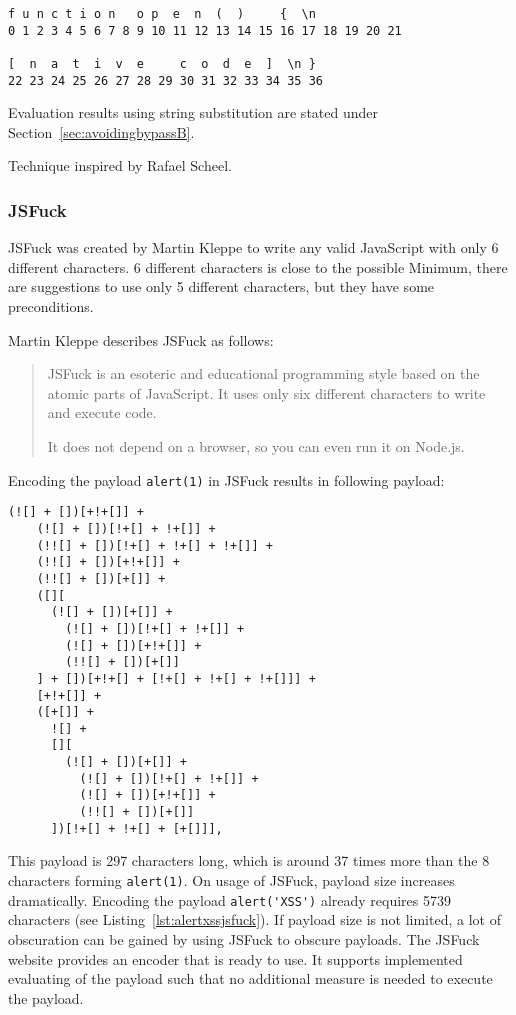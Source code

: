 \begin{lstlisting}[style=basicStyle, caption=open.toString() with indices in JavaScript, label={lst:opentostringindices}]
f u n c t i o n   o p  e  n  (  )     {  \n
0 1 2 3 4 5 6 7 8 9 10 11 12 13 14 15 16 17 18 19 20 21

[  n  a  t  i  v  e     c  o  d  e  ]  \n }
22 23 24 25 26 27 28 29 30 31 32 33 34 35 36
\end{lstlisting}

Evaluation results using string substitution are stated under Section~\ref{sec:avoidingbypassB}.

Technique inspired by Rafael Scheel. \cite{onecons/wafbypass}


\subsubsection{JSFuck}
\label{sec:jsfuck}
JSFuck was created by Martin Kleppe to write any valid JavaScript with only 6 different characters. 6 different characters is close to the possible Minimum, there are suggestions to use only 5 different characters, but they have some preconditions. \cite{mk/five, tc39/pipeline}

Martin Kleppe describes JSFuck as follows:
\begin{quote}
	JSFuck is an esoteric and educational programming style based on the atomic parts of JavaScript. It uses only six different characters to write and execute code.

	It does not depend on a browser, so you can even run it on Node.js. \cite{mk/jsfuck}
\end{quote}

Encoding the payload \verb|alert(1)| in JSFuck results in following payload:

\begin{lstlisting}[style=basicStyle, caption=alert(1) in JSFuck, label={lst:alert1jsfuck}]
  (![] + [])[+!+[]] +
    (![] + [])[!+[] + !+[]] +
    (!![] + [])[!+[] + !+[] + !+[]] +
    (!![] + [])[+!+[]] +
    (!![] + [])[+[]] +
    ([][
      (![] + [])[+[]] +
        (![] + [])[!+[] + !+[]] +
        (![] + [])[+!+[]] +
        (!![] + [])[+[]]
    ] + [])[+!+[] + [!+[] + !+[] + !+[]]] +
    [+!+[]] +
    ([+[]] +
      ![] +
      [][
        (![] + [])[+[]] +
          (![] + [])[!+[] + !+[]] +
          (![] + [])[+!+[]] +
          (!![] + [])[+[]]
      ])[!+[] + !+[] + [+[]]],
\end{lstlisting}

This payload is 297 characters long, which is around 37 times more than the 8 characters forming \verb|alert(1)|. On usage of JSFuck, payload size increases dramatically. Encoding the payload \verb|alert('XSS')| already requires 5739 characters (see Listing~\ref{lst:alertxssjsfuck}). If payload size is not limited, a lot of obscuration can be gained by using JSFuck to obscure payloads. The JSFuck website provides an encoder that is ready to use. It supports implemented evaluating of the payload such that no additional measure is needed to execute the payload. \cite{mk/jsfuck}

